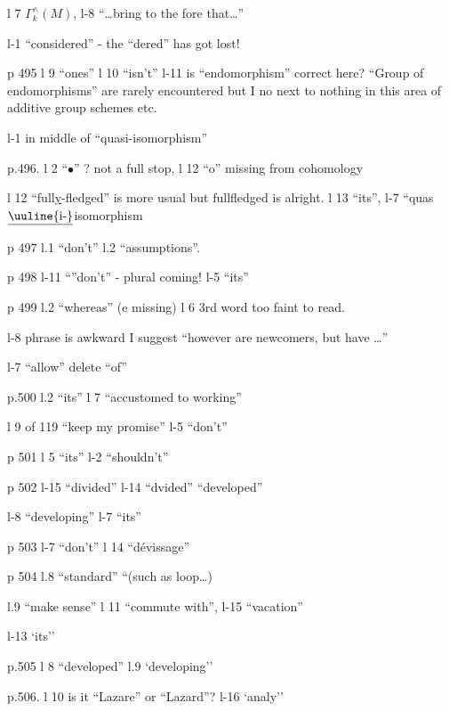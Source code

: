 l 7 $\Gamma_{k}^{\wedge}(M)$, \quad l-8 ``\ldots{}bring to the fore that\ldots''

l-1 ``considered'' - the ``dered'' has got lost!

p 495 l 9 ``ones'' \quad l 10 ``isn't'' \quad l-11 is ``endomorphism'' correct here? ``Group of endomorphisms'' are rarely encountered but I no next to nothing in this area of additive group schemes etc.

l-1 \unsure{-|$\leftarrow$} in middle of ``quasi-isomorphism''

p.496. l 2 ``\(\bullet\)'' ? not a full stop, \quad l 12 ``o'' missing from cohomology

l 12 ``full\uline{y}-fledged'' is  more usual but fullfledged is alright. \quad l 13 ``its'', \quad l-7 ``quas$\underline{\text{\uuline{i-}}}$isomorphism

p 497 l.1 ``don't'' \quad l.2 ``assumptions''.

p 498 l-11 ``''don't'' - plural coming! \quad l-5 ``its''


p 499 l.2 ``whereas'' (e missing) \quad l 6 3rd word too faint to read.

l-8 phrase is awkward I suggest ``however are newcomers, but have \ldots{}''

l-7 ``allow'' delete ``of''

p.500 l.2 ``its'' \quad l 7 ``accustomed to working''

l 9 of 119 ``keep my promise'' \quad l-5 ``don't''

p 501 l 5 ``its'' \quad l-2 ``shouldn't''

p 502 l-15 ``divided'' \quad l-14 ``dvided'' ``developed''

l-8 ``developing'' \quad l-7 ``its''

p 503 l-7 ``don't'' \quad l 14 ``dévissage''

p 504 l.8 ``standard'' \quad ``(such as loop\ldots{})

l.9 ``make sense'' \quad l 11 ``commute with'', \quad l-15 ``vacation''

l-13 `its''

p.505 l 8 ``developed'' \quad l.9 `developing''

p.506. l 10 is it ``Lazare'' or ``Lazard''? \quad l-16 `analy''


